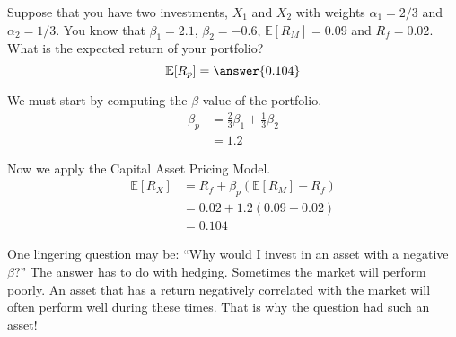 \documentclass{ximera}
\begin{document}
\begin{question}
Suppose that you have two investments, $X_1$ and $X_2$ with weights $\alpha_1=2/3$ and $\alpha_2=1/3$. You know that $\beta_1=2.1$, $\beta_2=-0.6$, $\mathbb{E}[R_M]=0.09$ and $R_f=0.02$. What is the expected return of your portfolio?
\[
\mathbb{E}[R_p]=\answer{0.104}
\]
\end{question}
\begin{solution}
We must start by computing the $\beta$ value of the portfolio.
	\begin{align*}
	\beta_p 	&=\frac{2}{3}\beta_1+\frac{1}{3}\beta_2\\
			&=1.2
	\end{align*}

Now we apply the Capital Asset Pricing Model.
	\begin{align*}
	\mathbb{E}[R_X] 	&=R_f+\beta_p(\mathbb{E}[R_M]-R_f)\\
				&=0.02+1.2(0.09-0.02)\\
				&=0.104
	\end{align*}
	
\end{solution}

One lingering question may be: ``Why would I invest in an asset with a negative $\beta$?'' The answer has to do with hedging. Sometimes the market will perform poorly. An asset that has a return negatively correlated with the market will often perform well during these times. That is why the question had such an asset!
\end{document}

